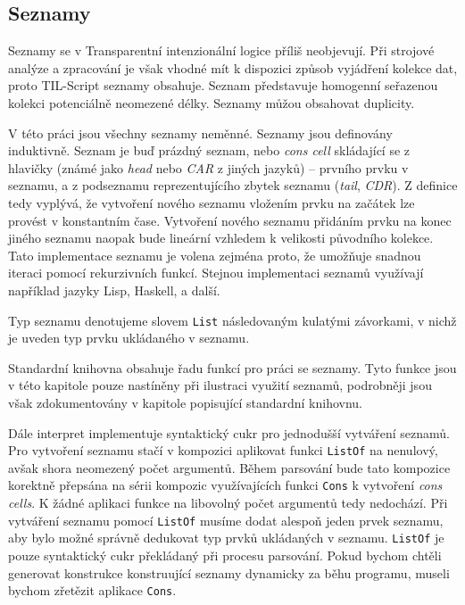 \subsection{Seznamy}

Seznamy se v Transparentní intenzionální logice příliš neobjevují. Při strojové analýze a
zpracování je však vhodné mít k dispozici způsob vyjádření kolekce dat, proto TIL-Script seznamy
obsahuje. Seznam představuje homogenní seřazenou kolekci potenciálně neomezené délky. Seznamy můžou
obsahovat duplicity.

V této práci jsou všechny seznamy neměnné. Seznamy jsou definovány induktivně. Seznam je buď
prázdný seznam, nebo \textit{cons cell} skládající se z hlavičky (známé jako \textit{head} nebo
\textit{CAR} z jiných jazyků) -- prvního prvku v seznamu, a z podseznamu reprezentujícího
zbytek seznamu (\textit{tail}, \textit{CDR}). Z definice tedy vyplývá, že vytvoření nového seznamu
vložením prvku na začátek lze provést v konstantním čase. Vytvoření nového seznamu přidáním prvku
na konec jiného seznamu naopak bude lineární vzhledem k velikosti původního kolekce. Tato
implementace seznamu je volena zejména proto, že umožňuje snadnou iteraci pomocí rekurzivních funkcí.
Stejnou implementaci seznamů využívají například jazyky Lisp, Haskell, a další.

Typ seznamu denotujeme slovem \lstinline{List} následovaným kulatými závorkami, v nichž je uveden
typ prvku ukládaného v seznamu.

Standardní knihovna obsahuje řadu funkcí pro práci se seznamy. Tyto funkce jsou v této kapitole
pouze nastíněny při ilustraci využití seznamů, podrobněji jsou však zdokumentovány v kapitole
popisující standardní knihovnu.

Dále interpret implementuje syntaktický cukr pro jednodušší vytváření seznamů. Pro vytvoření
seznamu stačí v kompozici aplikovat funkci \lstinline{ListOf} na nenulový, avšak shora neomezený
počet argumentů. Během parsování bude tato kompozice korektně přepsána na sérii kompozic
využívajících funkci \lstinline{Cons} k vytvoření \textit{cons cells}. K žádné aplikaci funkce
na libovolný počet argumentů tedy nedochází. Při vytváření seznamu pomocí \lstinline{ListOf} musíme
dodat alespoň jeden prvek seznamu, aby bylo možné správně dedukovat typ prvků ukládaných v seznamu.
\lstinline{ListOf} je pouze syntaktický cukr překládaný při procesu parsování. Pokud bychom chtěli
generovat konstrukce konstruující seznamy dynamicky za běhu programu, museli bychom zřetězit
aplikace \lstinline{Cons}.

